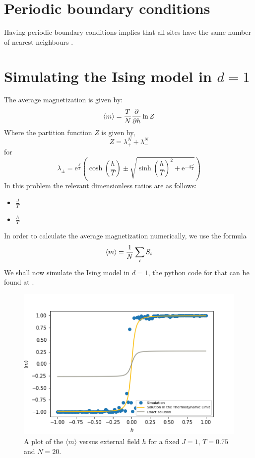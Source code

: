 \documentclass{cernatsnote}
\begin{document}
\section{Periodic boundary conditions}
Having periodic boundary conditions implies that all sites have the same number of  nearest neighbours \cite{newman}.
\section{Simulating the Ising model in $d=1$}
The average magnetization is given by:
\begin{equation}
    \expval{m} = \frac{T}{N} \frac{\partial}{\partial h}\ln{Z}
\end{equation}
Where the partition function $Z$ is given by,
\begin{equation}
    Z = \lambda_{+}^{N} + \lambda_{-}^{N}
\end{equation}
for
\begin{equation}
    \lambda_{\pm} = \mathrm{e}^{\frac{J}{T}}\left(\cosh \left(\frac{h}{T}\right) \pm \sqrt{\sinh \left(\frac{h}{T}\right)^2+\mathrm{e}^{-4 \frac{J}{T}}}\right)
\end{equation}
In this problem the relevant dimensionless ratios are as follows:
\begin{itemize}
    \item $\frac{J}{T}$
    \item $\frac{h}{T}$
\end{itemize}
In order to calculate the average magnetization numerically, we use the formula
\begin{equation}
   \expval{m}  = \frac{1}{N} \sum_{i}S_{i}
\end{equation}
We shall now simulate the Ising model in $d=1$, the python code for that can be found at \cite{github}. 
\begin{figure}[H]
    \centering
    \includegraphics[scale =0.7]{images/m_v_h.png}
    \caption{A plot of the $\langle m \rangle$ versus external field $h$ for a fixed $J = 1$, $T = 0.75$ and $N = 20$.}
    \label{fig:h_v_m}
\end{figure}
\end{document}
